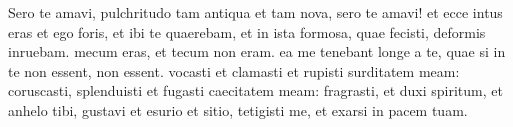 
Sero te amavi, pulchritudo tam antiqua et tam nova, sero te amavi! et ecce intus eras et ego foris, et ibi te quaerebam, et in ista formosa, quae fecisti, deformis inruebam. mecum eras, et tecum non eram. ea me tenebant longe a te, quae si in te non essent, non essent. vocasti et clamasti et rupisti surditatem meam: coruscasti, splenduisti et fugasti caecitatem meam: fragrasti, et duxi spiritum, et anhelo tibi, gustavi et esurio et sitio, tetigisti me, et exarsi in pacem tuam.